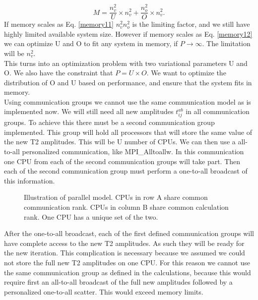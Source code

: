 \documentclass[a4paper,norsk,11pt,twoside]{report}
\begin{document}
\begin{equation}
M = \frac{n_v^2}{U} \times n_v^2 + \frac{n_o^2}{O} \times n_v^2 . \label{memory12} 
\end{equation}
If memory scales as Eq. \eqref{memory11} $n_v^2 n_o^2$ is the limiting factor, and we still have highly limited available system size. However if memory scales as Eq. \eqref{memory12} we can optimize U and O to fit any system in memory, if $P \rightarrow \infty$. The limitation will be $n_v^2$.  \\

This turns into an optimization problem with two variational parameters U and O. We also have the constraint that $P = U \times O$. We want to optimize the distribution of O and U based on performance, and ensure that the system fits in memory. \\

Using communication groups we cannot use the same communication model as is implemented now. We will still need all new amplitudes $t_{ij}^{ab}$ in all communication groups. To achieve this there must be a second communication group implemented. This group will hold all processors that will store the same value of the new T2 amplitudes. This will be U number of CPUs. We can then use a all-to-all personalized communication, like MPI\_Alltoallw. In this communication one CPU from each of the second communication groups will take part. Then each of the second communication group must perform a one-to-all broadcast of this information. \\

\begin{figure}[h!]
\begin{center}
\caption{Illustration of parallel model. CPUs in row A share common communication rank. CPUs in column B share common calculation rank. One CPU has a unique set of the two.}
\label{fig:p_u_model}
\end{center}
\end{figure}

After the one-to-all broadcast, each of the first defined communication groups will have complete access to the new T2 amplitudes. As such they will be ready for the new iteration. This complication is necessary because we assumed we could not store the full new T2 amplitudes on one CPU. For this reason we cannot use the same communication group as defined in the calculations, because this would require first an all-to-all broadcast of the full new amplitudes followed by a personalized one-to-all scatter. This would exceed memory limits. \\
\end{document}
